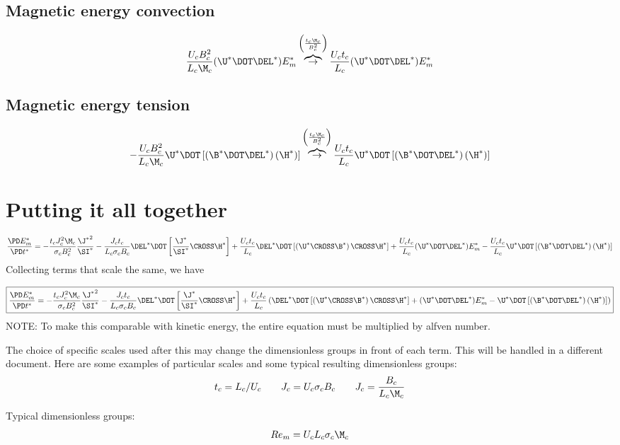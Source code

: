 \documentclass[landscape,11pt]{article}
\newcommand{\OB}{\overbrace{\rightarrow}^{\left(\frac{t_c \M_c}{B_c^2}\right)}}
\begin{document}
\subsection{Magnetic energy convection}
\begin{equation}
	\frac{U_c B_c^2}{L_c \M_c} (\U^* \DOT \DEL^*) E_m^*
	\OB
	\frac{U_c t_c}{L_c} (\U^* \DOT \DEL^*) E_m^*
\end{equation}
\subsection{Magnetic energy tension}
\begin{equation}
	- \frac{U_c B_c^2}{L_c \M_c} \U^* \DOT \left[(\B^* \DOT \DEL^*) \left( \H^* \right) \right]
	\OB
	\frac{U_c t_c}{L_c} \U^* \DOT \left[(\B^* \DOT \DEL^*) \left( \H^* \right) \right]
\end{equation}
\section{Putting it all together}
\begin{equation}
	\frac{\PD E_m^*}{\PD t^*} =
	- \frac{t_c J_c^2 \M_c}{\sigma_c B_c^2} \frac{{\J^*}^2}{\SI^*}
	- \frac{J_c t_c}{L_c \sigma_c B_c} \DEL^* \DOT \left[\frac{\J^*}{\SI^*} \CROSS \H^* \right]
	+ \frac{U_c t_c}{L_c} \DEL^* \DOT \left[\left(\U^* \CROSS \B^* \right) \CROSS \H^* \right]
	+ \frac{U_c t_c}{L_c} (\U^* \DOT \DEL^*) E_m^*
	- \frac{U_c t_c}{L_c} \U^* \DOT \left[(\B^* \DOT \DEL^*) \left( \H^* \right) \right]
\end{equation}
Collecting terms that scale the same, we have

\begin{equation}
	\boxed{
	\frac{\PD E_m^*}{\PD t^*} =
	- \frac{t_c J_c^2 \M_c}{\sigma_c B_c^2} \frac{{\J^*}^2}{\SI^*}
	- \frac{J_c t_c}{L_c \sigma_c B_c} \DEL^* \DOT \left[\frac{\J^*}{\SI^*} \CROSS \H^* \right]
	+ \frac{U_c t_c}{L_c} \left(
	\DEL^* \DOT \left[\left(\U^* \CROSS \B^* \right) \CROSS \H^* \right]
	+ (\U^* \DOT \DEL^*) E_m^*
	- \U^* \DOT \left[(\B^* \DOT \DEL^*) \left( \H^* \right) \right]
	\right)
	}
\end{equation}
NOTE: To make this comparable with kinetic energy, the entire equation must be multiplied by alfven number.

The choice of specific scales used after this may change the dimensionless groups in front of each term. This will be handled in a different document. Here are some examples of particular scales and some typical resulting dimensionless groups:
\begin{equation}\begin{aligned}
	t_c = L_c/ U_c \qquad
	J_c = U_c \sigma_c B_c \qquad
	J_c = \frac{B_c}{L_c \M_c}
\end{aligned}\end{equation}

Typical dimensionless groups:
\begin{equation}
	Re_m = U_c L_c \sigma_c \M_c
\end{equation}
\end{document}

